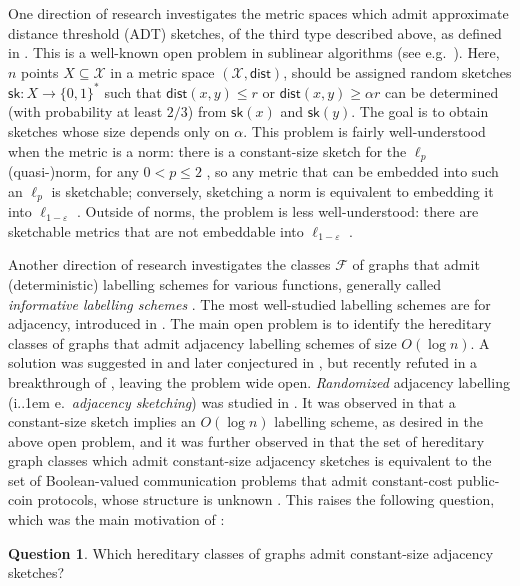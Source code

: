\documentclass[11pt]{article}
\newcommand*\ie{i.\kern.1em e.\ }
\theoremstyle{definition}
\newtheorem{qn}{Question}
\newcommand{\zo}{\{0,1\}}
\newcommand{\sk}{\mathsf{sk}}
\newcommand{\eps}{\varepsilon}
\renewcommand{\leq}{\leqslant}
\renewcommand{\geq}{\geqslant}
\def\F {{\mathcal F}}
\def\X {{\mathcal X}}
\def\sk {\mathsf{sk}}
\newcommand{\dist}{\mathsf{dist}}
\begin{document}
One direction of research investigates the metric spaces which admit approximate distance threshold
(ADT) sketches, of the third type described above, as defined in \cite{SS02}. This is a well-known
open problem in sublinear algorithms (see e.g.~\cite{AK08,sublinear25,Raz17}).  Here, $n$ points $X
\subseteq \X$ in a metric space $(\X, \dist)$, should be assigned random sketches $\sk: X \to \zo^*$
such that $\dist(x,y) \leq r$ or $\dist(x,y) \geq \alpha r$ can be determined (with probability at
least $2/3$) from $\sk(x)$ and $\sk(y)$.  The goal is to obtain sketches whose size depends only on
$\alpha$. This problem is fairly well-understood when the metric is a norm: there is a constant-size
sketch for the $\ell_p$ (quasi-)norm, for any $0 < p \leq 2$ \cite{Ind06}, so any metric that can be
embedded into such an $\ell_p$ is sketchable; conversely, sketching a norm is equivalent to
embedding it into $\ell_{1-\eps}$ \cite{AKR18}. Outside of norms, the problem is less
well-understood: there are sketchable metrics that are not embeddable into $\ell_{1-\eps}$
\cite{KN19}. 

Another direction of research investigates the classes $\F$ of graphs that admit (deterministic)
labelling schemes for various functions, generally called \emph{informative labelling schemes}
\cite{Pel05}. The most well-studied labelling schemes are for adjacency, introduced in
\cite{KNR92,Mul89}. The main open problem is to identify the hereditary classes of graphs that admit
adjacency labelling schemes of size $O(\log n)$. A solution was suggested in \cite{KNR92} and later
conjectured in \cite{Spin03}, but recently refuted in a breakthrough of \cite{HH21}, leaving the
problem wide open. \emph{Randomized} adjacency labelling (\ie \emph{adjacency sketching}) was
studied in \cite{FK09,Har20,HWZ21}. It was observed in \cite{Har20,HWZ21} that a constant-size
sketch implies an $O(\log n)$ labelling scheme, as desired in the above open problem, and it was
further observed in \cite{HWZ21} that the set of hereditary graph classes which admit constant-size
adjacency sketches is equivalent to the set of Boolean-valued communication problems that admit
constant-cost public-coin protocols, whose structure is unknown \cite{HHH21b}.  This raises the
following question, which was the main motivation of \cite{HWZ21}:

\begin{qn}
\label{question:adjacency}
Which hereditary classes of graphs admit constant-size adjacency sketches?
\end{qn}
\end{document}
